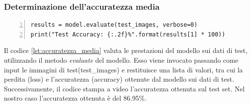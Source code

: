 \documentclass[a4paper,final,12pt]{report}
\begin{document}
\subsubsection{Determinazione dell'accuratezza media}
\begin{lstlisting}[caption={Determinazione dell'accuratezza.}, label={lst:accuratezza_media}, breaklines, escapechar=`\%, frame=lines, basicstyle=\small\ttfamily, keepspaces=true, numbers=left]
results = model.evaluate(test_images, verbose=0)
print("Test Accuracy: {:.2f}%".format(results[1] * 100))
\end{lstlisting}
Il codice \ref{lst:accuratezza_media} valuta le prestazioni del modello sui dati di test, utilizzando il metodo \textit{evaluate} del modello. Esso viene invocato passando come input le immagini di test(test\_images) e restituisce una lista di valori, tra cui la perdita (loss) e l'accuratezza (accuracy) ottenute dal modello sui dati di test.
Successivamente, il codice stampa a video l'accuratezza ottenuta sul test set.
Nel nostro caso l'accuratezza ottenuta è del 86.95\%.
\end{document}
